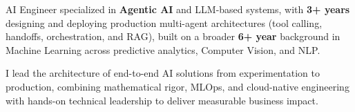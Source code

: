 %
%
%
\par{
AI Engineer specialized in \textbf{Agentic AI} and LLM-based systems, with \textbf{3+ years} designing and deploying production multi-agent architectures (tool calling, handoffs, orchestration, and RAG), built on a broader \textbf{6+ year} background in Machine Learning across predictive analytics, Computer Vision, and NLP.
}
\par{
I lead the architecture of end-to-end AI solutions from experimentation to production, combining mathematical rigor, MLOps, and cloud-native engineering with hands-on technical leadership to deliver measurable business impact.
}
\vspace{1em}